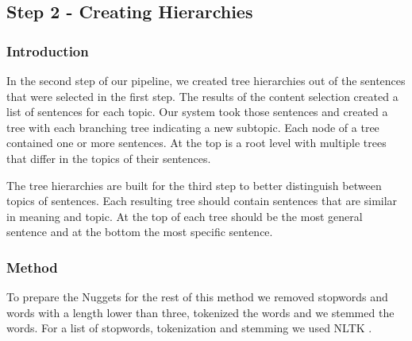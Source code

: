 



\subsection{Step 2 - Creating Hierarchies}

\subsubsection{Introduction}

In the second step of our pipeline, we created tree hierarchies out of the sentences that were selected in the first step. The results of the content selection created a list of sentences for each topic. Our system took those sentences and created a tree with each branching tree indicating a new subtopic. Each node of a tree contained one or more sentences. At the top is a root level with multiple trees that differ in the topics of their sentences. 

The tree hierarchies are built for the third step to better distinguish between topics of sentences. Each resulting tree should contain sentences that are similar in meaning and topic. At the top of each tree should be the most general sentence and at the bottom the most specific sentence.


\subsubsection{Method}

To prepare the Nuggets for the rest of this method we removed stopwords and words with a length lower than three, tokenized the words and we stemmed the words. For a list of stopwords, tokenization and stemming we used NLTK \cite{nltk}.

